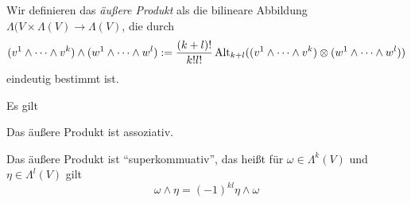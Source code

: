 \begin{definition}
  Wir definieren das \emph{äußere Produkt} als die bilineare Abbildung
  $\Lambda(V\times \Lambda(V) \to \Lambda(V)$, die durch
  \begin{equation*}
    (v^1\wedge \dots \wedge v^k) \wedge (w^1\wedge \dots \wedge w^l) :=
    \frac{(k+l)!}{k!l!}\operatorname{Alt}_{k+l}((v^1\wedge \dots \wedge v^k) \otimes
    (w^1\wedge \dots \wedge w^l))
  \end{equation*}
  eindeutig bestimmt ist.
\end{definition}

\begin{proposition}
  Es gilt
  \begin{statements}
  \item Das äußere Produkt ist assoziativ.
  \item Das äußere Produkt ist ``superkommuativ'', das heißt für
    $\omega \in \Lambda^k(V)$ und $\eta \in \Lambda^l(V)$ gilt
    \begin{equation*}
      \omega \wedge \eta = (-1)^{kl}\eta\wedge \omega
    \end{equation*}
  \end{statements}
\end{proposition}

